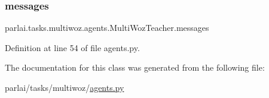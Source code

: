 \subsubsection{\texorpdfstring{messages}{messages}}
{\footnotesize\ttfamily parlai.\+tasks.\+multiwoz.\+agents.\+Multi\+Woz\+Teacher.\+messages}



Definition at line 54 of file agents.\+py.



The documentation for this class was generated from the following file\+:\begin{DoxyCompactItemize}
\item 
parlai/tasks/multiwoz/\hyperlink{parlai_2tasks_2multiwoz_2agents_8py}{agents.\+py}\end{DoxyCompactItemize}
